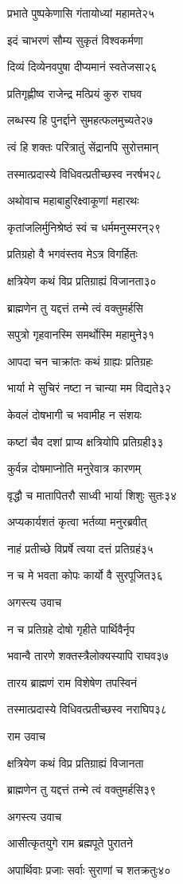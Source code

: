 प्रभाते पुष्पकेणासि गंतायोध्यां महामते२५

इदं चाभरणं सौम्य सुकृतं विश्वकर्मणा

दिव्यं दिव्येनवपुषा दीप्यमानं स्वतेजसा२६

प्रतिगृह्णीष्व राजेन्द्र मत्प्रियं कुरु राघव

लब्धस्य हि पुनर्द्दाने सुमहत्फलमुच्यते२७

त्वं हि शक्तः परित्रातुं सेंद्रानपि सुरोत्तमान्

तस्मात्प्रदास्ये विधिवत्प्रतीच्छस्व नरर्षभ२८

अथोवाच महाबाहुरिक्ष्वाकूणां महारथः

कृतांजलिर्मुनिश्रेष्ठं स्वं च धर्ममनुस्मरन्२९

प्रतिग्रहो वै भगवंस्तव मेऽत्र विगर्हितः

क्षत्रियेण कथं विप्र प्रतिग्राह्यं विजानता३०

ब्राह्मणेन तु यद्दत्तं तन्मे त्वं वक्तुमर्हसि

सपुत्रो गृहवानस्मि समर्थोस्मि महामुने३१

आपदा चन चाक्रांतः कथं ग्राह्यः प्रतिग्रहः

भार्या मे सुचिरं नष्टा न चान्या मम विद्यते३२

केवलं दोषभागी च भवामीह न संशयः

कष्टां चैव दशां प्राप्य क्षत्रियोपि प्रतिग्रही३३

कुर्वन्न दोषमाप्नोति मनुरेवात्र कारणम्

वृद्धौ च मातापितरौ साध्वी भार्या शिशुः सुतः३४

अप्यकार्यशतं कृत्वा भर्तव्या मनुरब्रवीत्

नाहं प्रतीच्छे विप्रर्षे त्वया दत्तं प्रतिग्रहं३५

न च मे भवता कोपः कार्यो वै सुरपूजित३६

अगस्त्य उवाच

न च प्रतिग्रहे दोषो गृहीते पार्थिवैर्नृप

भवान्वै तारणे शक्तस्त्रैलोक्यस्यापि राघव३७

तारय ब्राह्मणं राम विशेषेण तपस्विनं

तस्मात्प्रदास्ये विधिवत्प्रतीच्छस्व नराघिप३८

राम उवाच

क्षत्रियेण कथं विप्र प्रतिग्राह्यं विजानता

ब्राह्मणेन तु यद्दत्तं तन्मे त्वं वक्तुमर्हसि३९

अगस्त्य उवाच

आसीत्कृतयुगे राम ब्रह्मपूते पुरातने

अपार्थिवाः प्रजाः सर्वाः सुराणां च शतक्रतुः४०

